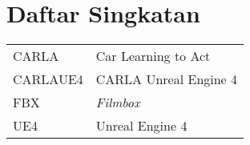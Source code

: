 \chapter*{Daftar Singkatan}

\begingroup
\def\arraystretch{1.25}
\begin{tabular}{p{4cm}l}

	CARLA & Car Learning to Act \\
	CARLAUE4 & CARLA Unreal Engine 4 \\
	FBX & \textit{Filmbox} \\
	UE4 & Unreal Engine 4 \\

\end{tabular}
\endgroup
\clearpage
